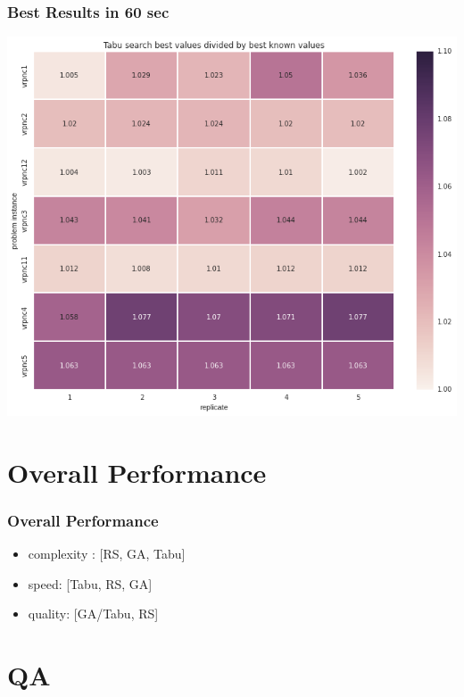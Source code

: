 \documentclass{beamer}
\begin{document}
\begin{frame}
\frametitle{Best Results in 60 sec}
\begin{center}
\includegraphics[scale=0.25]{figs/tabu_search}

\end{center}
\end{frame}



\section{Overall Performance}

\begin{frame}
\frametitle{Overall Performance}
\begin{itemize}
	\item complexity : [RS, GA, Tabu]
	\item speed: [Tabu, RS, GA]
	\item quality: [GA/Tabu, RS]
\end{itemize}
\end{frame}


\section{QA}
\end{document}

